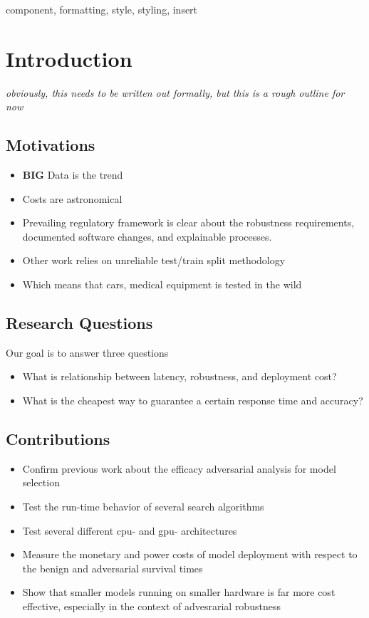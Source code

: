 \documentclass[conference]{IEEEtran}
\newcommand{\cm}[1]{\textit{{\color{blue}#1}}}
\begin{document}
\begin{IEEEkeywords}
component, formatting, style, styling, insert
\end{IEEEkeywords}


\section{Introduction}
\cm{obviously, this needs to be written out formally, but this is a rough outline for now}
\subsection{Motivations}
\begin{itemize}
    \item \textbf{BIG} Data is the trend
    \item Costs are astronomical
    \item Prevailing regulatory framework is clear about the robustness requirements, documented software changes, and explainable processes.
    \item Other work relies on unreliable test/train split methodology
    \item Which means that cars, medical equipment is tested in the wild
\end{itemize}


\subsection{Research Questions}
Our goal is to answer three questions

\begin{itemize}
    \item What is relationship between latency, robustness, and deployment cost?
    \item What is the cheapest way to guarantee a certain response time and accuracy?
\end{itemize}

\subsection{Contributions}
\begin{itemize}
    \item Confirm previous work about the efficacy adversarial analysis for model selection
    \item Test the run-time behavior of several search algorithms
    \item Test several different cpu- and gpu- architectures
    \item Measure the monetary and power costs of model deployment with respect to the benign and adversarial survival times
    \item Show that smaller models running on smaller hardware is far more cost effective, especially in the context of advesrarial robustness
\end{itemize}
\end{document}
